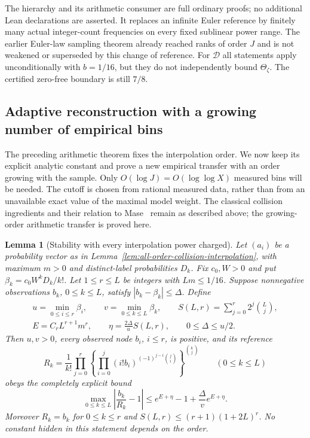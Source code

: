 \documentclass[11pt]{article}
\newtheorem{lemma}[theorem]{Lemma}
\theoremstyle{definition}
\begin{document}
The hierarchy and its arithmetic consumer are full ordinary proofs;
no additional Lean declarations are asserted.
It replaces an infinite Euler reference by finitely many actual
integer-count frequencies on every fixed sublinear power range.
The earlier Euler-law sampling theorem already reached ranks of
order $J$ and is not weakened or superseded by this change of
reference.
For $\mathcal D$ all statements apply unconditionally with
$b=1/16$, but they do not independently bound $\Theta_\zeta$.
The certified zero-free boundary is still $7/8$.

\subsection{Adaptive reconstruction with a growing number of empirical bins}
\label{sec:adaptive-bin-reconstruction}

The preceding arithmetic theorem fixes the interpolation order.
We now keep its explicit analytic constant and prove a new
empirical transfer with an order growing with the sample.
Only $O(\log J)=O(\log\log X)$ measured bins will be needed.
The cutoff is chosen from rational measured data, rather than
from an unavailable exact value of the maximal model weight.
The classical collision ingredients and their relation to
Mase~\cite{MaseCollision} remain as described above;
the growing-order arithmetic transfer is proved here.

\begin{lemma}[Stability with every interpolation power charged]
\label{lem:adaptive-bin-stability}
Let $(a_i)$ be a probability vector as in
Lemma~\ref{lem:all-order-collision-interpolation}, with maximum
$m>0$ and distinct-label probabilities $D_k$.
Fix $c_0,W>0$ and put $\beta_k=c_0W^kD_k/k!$.
Let $1\le r\le L$ be integers with $Lm\le1/16$.
Suppose nonnegative observations $b_k$, $0\le k\le L$,
satisfy $|b_k-\beta_k|\le\Delta$.
Define
\begin{equation}
 \begin{gathered}
 u=\min_{0\le i\le r}\beta_i,\qquad
 v=\min_{0\le k\le L}\beta_k,\qquad
 S(L,r)=\sum_{j=0}^r2^j{L\choose j},\\
 E=C_rL^{r+1}m^r,\qquad
 \eta=\frac{2\Delta}{u}S(L,r),
 \qquad 0\le\Delta\le u/2 .
 \end{gathered}
 \label{eq:adaptive-bin-noise-budget}
\end{equation}
Then $u,v>0$, every observed node $b_i$, $i\le r$, is
positive, and its reference
\[
 R_k=\frac1{k!}\prod_{j=0}^r
       \left\{\prod_{i=0}^j(i!b_i)^{(-1)^{j-i}\binom ji}\right\}^{\binom kj}
                         \qquad(0\le k\le L)
\]
obeys the completely explicit bound
\begin{equation}
 \max_{0\le k\le L}\left|\frac{b_k}{R_k}-1\right|
       \le e^{E+\eta}-1+\frac{\Delta}{v}e^{E+\eta}.
 \label{eq:adaptive-bin-stability-bound}
\end{equation}
Moreover $R_k=b_k$ for $0\le k\le r$ and
$S(L,r)\le(r+1)(1+2L)^r$.
No constant hidden in this statement depends on the order.
\end{lemma}
\end{document}
